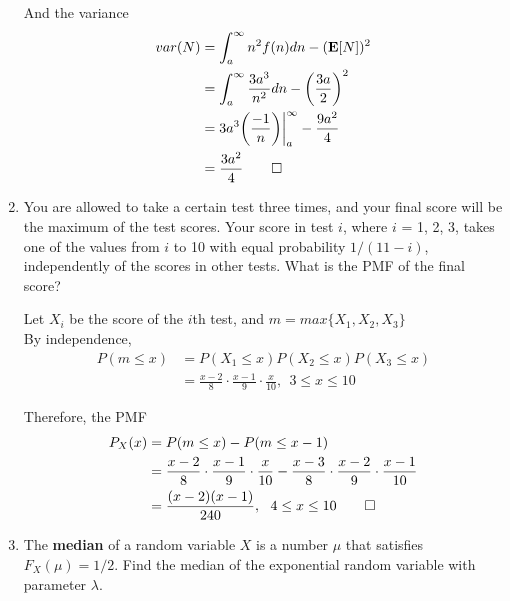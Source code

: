 \documentclass[paper=usletter, fontsize=12pt]{article}
\begin{document}
\begin{enumerate}
\begin{cproof}
            And the variance
            \begin{align*}
                var(N) & = \int_{a}^{\infty}n^2f(n)dn - (\textbf{E}[N])^2 \\
                & = \int_{a}^{\infty}\frac{3a^3}{n^2}dn - \bigg(\frac{3a}{2}\bigg)^2\\
                & = 3a^3\bigg(\frac{-1}{n}\bigg)\bigg\vert_{a}^{\infty}-\frac{9a^2}{4}\\
                & = \frac{3a^2}{4} \qedhere
            \end{align*}
            \endgroup

        \end{cproof}

        \item You are allowed to take a certain test three times, and your
        final score will be the maximum of the test scores. Your score in test
        $i$, where $i$ = 1, 2, 3, takes one of the values from $i$ to 10 with
        equal probability $1/(11-i)$, independently of the scores in other
        tests. What is the PMF of the final score?
        \begin{cproof}

            Let $X_i$ be the score of the $i$th test, and $m=max\{X_1,X_2,X_3\}$\\
            By independence,
            \begin{align*}
                P(m \le x) &= P(X_1 \le x)P(X_2 \le x)P(X_3 \le x)\\
                & = \frac{x-2}{8}\cdot\frac{x-1}{9}\cdot\frac{x}{10}, \ \ 3 \le x \le 10
            \end{align*}
            \endgroup

            Therefore, the PMF
            \begin{align*}
                P_X(x) &= P(m \le x) - P(m \le x-1)\\
                & = \frac{x-2}{8}\cdot\frac{x-1}{9}\cdot\frac{x}{10} - \frac{x-3}{8}\cdot\frac{x-2}{9}\cdot\frac{x-1}{10}\\
                & = \frac{(x-2)(x-1)}{240}, \ \ 4 \le x \le 10 \qedhere
            \end{align*}
            \endgroup

        \end{cproof}

        \item The \textbf{median} of a random variable $X$ is a number $\mu$
        that satisfies $F_X(\mu)=1/2$. Find the median of the exponential
        random variable with parameter $\lambda$.
        \begin{cproof}


\end{cproof}
\end{enumerate}
\end{document}
